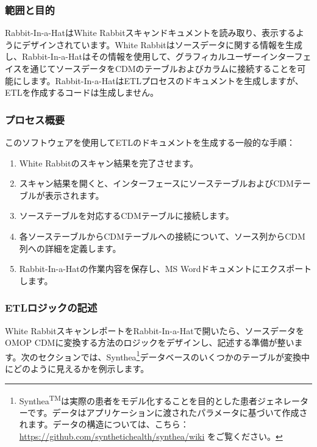 \documentclass[
  11pt]{book}
\providecommand{\tightlist}{%
  \setlength{\itemsep}{0pt}\setlength{\parskip}{0pt}}
\theoremstyle{definition}
\theoremstyle{definition}
\theoremstyle{definition}
\theoremstyle{definition}
\theoremstyle{remark}
\begin{document}
\subsubsection*{範囲と目的}\label{ux7bc4ux56f2ux3068ux76eeux7684-1}

Rabbit-In-a-HatはWhite Rabbitスキャンドキュメントを読み取り、表示するようにデザインされています。White Rabbitはソースデータに関する情報を生成し、Rabbit-In-a-Hatはその情報を使用して、グラフィカルユーザーインターフェイスを通じてソースデータをCDMのテーブルおよびカラムに接続することを可能にします。Rabbit-In-a-HatはETLプロセスのドキュメントを生成しますが、ETLを作成するコードは生成しません。

\subsubsection*{プロセス概要}\label{ux30d7ux30edux30bbux30b9ux6982ux8981-1}

このソフトウェアを使用してETLのドキュメントを生成する一般的な手順：

\begin{enumerate}
\def\labelenumi{\arabic{enumi}.}
\tightlist
\item
  White Rabbitのスキャン結果を完了させます。
\item
  スキャン結果を開くと、インターフェースにソーステーブルおよびCDMテーブルが表示されます。
\item
  ソーステーブルを対応するCDMテーブルに接続します。
\item
  各ソーステーブルからCDMテーブルへの接続について、ソース列からCDM列への詳細を定義します。
\item
  Rabbit-In-a-Hatの作業内容を保存し、MS Wordドキュメントにエクスポートします。
\end{enumerate}

\subsubsection*{ETLロジックの記述}\label{etlux30edux30b8ux30c3ux30afux306eux8a18ux8ff0}

White RabbitスキャンレポートをRabbit-In-a-Hatで開いたら、ソースデータをOMOP CDMに変換する方法のロジックをデザインし、記述する準備が整います。次のセクションでは、Synthea\footnote{Synthea\textsuperscript{TM}は実際の患者をモデル化することを目的とした患者ジェネレーターです。データはアプリケーションに渡されたパラメータに基づいて作成されます。データの構造については、こちら：\url{https://github.com/synthetichealth/synthea/wiki} をご覧ください。}データベースのいくつかのテーブルが変換中にどのように見えるかを例示します。
\end{document}
